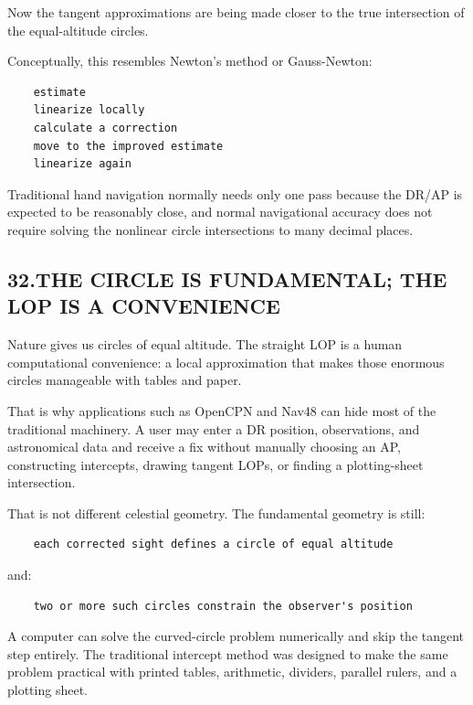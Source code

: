 \documentclass[11pt]{article}
\begin{document}
Now the tangent approximations are being made closer to the true intersection of the equal-altitude circles.

Conceptually, this resembles Newton's method or Gauss-Newton:

\begin{verbatim}
    estimate
    linearize locally
    calculate a correction
    move to the improved estimate
    linearize again
\end{verbatim}

Traditional hand navigation normally needs only one pass because the DR/AP is expected to be reasonably close, and normal navigational accuracy does not require solving the nonlinear circle intersections to many decimal places.

\subsection*{32.\quad THE CIRCLE IS FUNDAMENTAL; THE LOP IS A CONVENIENCE}

Nature gives us circles of equal altitude. The straight LOP is a human computational convenience: a local approximation that makes those enormous circles manageable with tables and paper.

That is why applications such as OpenCPN and Nav48 can hide most of the traditional machinery. A user may enter a DR position, observations, and astronomical data and receive a fix without manually choosing an AP, constructing intercepts, drawing tangent LOPs, or finding a plotting-sheet intersection.

That is not different celestial geometry. The fundamental geometry is still:

\begin{verbatim}
    each corrected sight defines a circle of equal altitude
\end{verbatim}

and:

\begin{verbatim}
    two or more such circles constrain the observer's position
\end{verbatim}

A computer can solve the curved-circle problem numerically and skip the tangent step entirely. The traditional intercept method was designed to make the same problem practical with printed tables, arithmetic, dividers, parallel rulers, and a plotting sheet.
\end{document}
